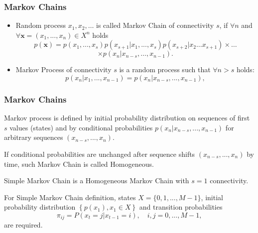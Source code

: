 \documentclass[14pt]{beamer}
\renewcommand{\vec}[1]{\ensuremath{\boldsymbol{#1}}}
\begin{document}
\begin{frame}
\frametitle{Markov Chains}
\begin{itemize}

    \item Random process $x_1 ,x_2 ,\dots$ is called Markov Chain of connectivity $s$, if
    $\forall n $ and  $\forall \vec x = (x_1,...,x_n ) \in X^n$ holds
    \[
    p(\vec x) = p(x_1 ,...,x_s )p(x_{s + 1} \vert x_1 ,...,x_s )p(x_{s
    + 2} \vert x_2 \dots x_{s + 1} )\times \dots
    \]
    \[
    \times p(x_n \vert x_{n - s} ,\dots,x_{n - 1} ).
    \]
    
    \item Markov Process of connectivity $s$ is a random process such that $\forall n > s$ holds:
    \[
    p(x_n \vert x_1 ,...,x_{n - 1} ) = p(x_n \vert x_{n - s} ,...,x_{n - 1} ),
    \]
    
\end{itemize}
\end{frame}



\begin{frame}
\frametitle{Markov Chains}
\begin{itemize}
\small{
    
    \item Markov process is defined by initial probability distribution on sequences of first $s$ values (states) and by conditional probabilities $p(x_n \vert x_{n - s} ,...,x_{n - 1} )$ for arbitrary sequences $(x_{n - s} ,...,x_n )$. 
    
    \item If conditional probabilities are unchanged after sequence shifts $(x_{n - s},...,x_n )$ by time, such Markov Chain is called Homogeneous.

    \item Simple Markov Chain is a Homogeneous Markov Chain with $s=1$ connectivity.
    
    \item For Simple Markov Chain definition, states $X = \{0,1,...,M - 1\}$, initial probability distribution $\left\{ {p(x_1 ),x_1 \in X} \right\}$ and transition probabilities 
    \[
    \pi _{ij} = P(x_t = j\vert x_{t - 1} = i), \quad i,j = 0,...,M - 1,
    \]
    are required.
}       
\end{itemize}
\end{frame}
\end{document}
